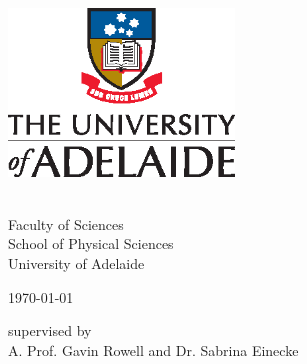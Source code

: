 \begin{titlepage}
\vspace*{-2cm}				%

\begin{center}
\makeatletter				%
\includegraphics[width=0.45\textwidth]{vertLogo.eps}\\[1.8cm]   	%

\vspace{0.6cm}							%
\LARGE{\@title}							%
\vspace{1.4cm}							%

\Large \@author	\\						%
\Large {Faculty of Sciences} \\			%
\Large {School of Physical Sciences} \\	%
\Large {University of Adelaide} 		%
\vspace{1.4cm}
	
\small \today							%

\vfill									%
\small {supervised by} \\
A. Prof. Gavin Rowell and Dr. Sabrina Einecke
\end{center}
\end{titlepage}


